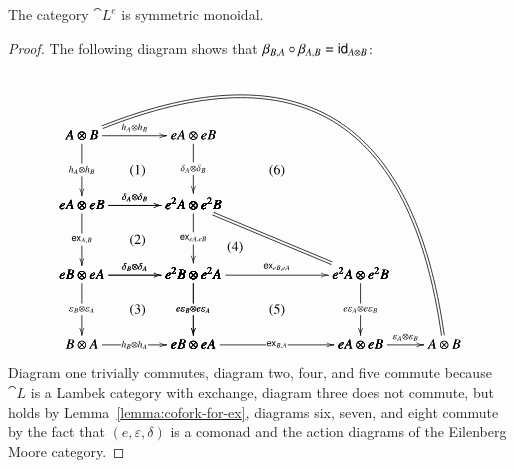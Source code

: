 \begin{lemma}
  \label{lemma:the_eilenberg-moore_category_is_symmetric_monoidal}
  The category $\cat{L}^e$ is symmetric monoidal.
\end{lemma}
\begin{proof}
  The following diagram shows that $\beta_{B,A} \circ \beta_{A,B} = \mathsf{id}_{A \otimes B}$:
  \[
  \bfig
  \square|amma|<800,500>[
    A \otimes B`
    eA \otimes eB`
    eA \otimes eB`
    e^2A \otimes e^2 B;
    h_A \otimes h_B`
    h_A \otimes h_B`
    \delta_A \otimes \delta_B`
    \delta_A \otimes \delta_B]

  \square(0,-500)|amma|<800,500>[
    eA \otimes eB`
    e^2A \otimes e^2B`
    eB \otimes eA`
    e^2B \otimes e^2A;
    \delta_A \otimes \delta_B`
    \e{A,B}`
    \e{eA,eB}`
    \delta_B \otimes \delta_A]

  \square(0,-1000)|ammm|<800,500>[
    eB \otimes eA`
    e^2B \otimes e^2A`
    B \otimes A`
    eB \otimes eA;
    \delta_B \otimes \delta_A`
    \varepsilon_B \otimes \varepsilon_A`
    e\varepsilon_{B} \otimes e\varepsilon_{A}`
    h_B \otimes h_A]

  \square(800,-1000)|ammm|<1200,500>[
    e^2B \otimes e^2A`
    e^2A \otimes e^2B`
    eB \otimes eA`
    eA \otimes eB;
    \e{eB,eA}`
    e\varepsilon_{B} \otimes e\varepsilon_{A}`
    e\varepsilon_{A} \otimes e\varepsilon_{B}`
    \e{B,A}]

  \btriangle(800,-500)|mmm|/`=`/<1200,500>[
    e^2A \otimes e^2B`
    e^2B \otimes e^2A`
    e^2A \otimes e^2B;``]

  \morphism(2000,-1000)<600,0>[
    eA \otimes eB`
    A \otimes B;
    \varepsilon_A \otimes \varepsilon_B]

  \morphism(0,500)/{@{=}@/^10em/}/<2600,-1500>[
    A \otimes B`
    A \otimes B;]

  \place(400,250)[(1)]
  \place(400,-250)[(2)]
  \place(400,-750)[(3)]
  \place(1100,-300)[(4)]
  \place(1400,-750)[(5)]
  \place(1400,250)[(6)]
  \efig
  \]
  Diagram one trivially commutes, diagram two, four, and five commute
  because $\cat{L}$ is a Lambek category with exchange, diagram three
  does not commute, but holds by Lemma~\ref{lemma:cofork-for-ex},
  diagrams six, seven, and eight commute by the fact that
  $(e,\varepsilon,\delta)$ is a comonad and the action diagrams of the
  Eilenberg Moore category.
  

\end{proof}
